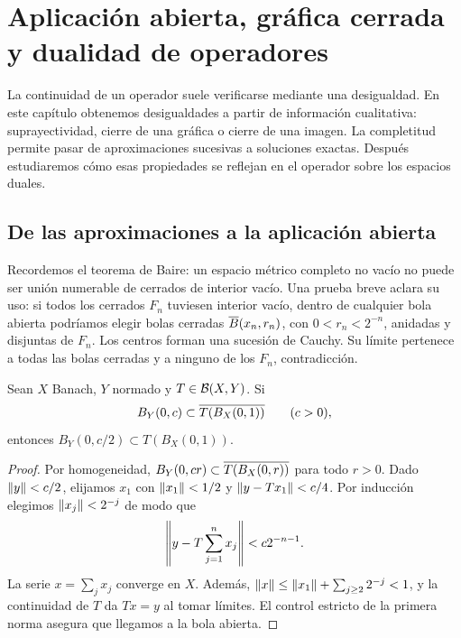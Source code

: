\chapter{Aplicación abierta, gráfica cerrada y dualidad de operadores}\label{cap:v3-04}
La continuidad de un operador suele verificarse mediante una desigualdad. En este capítulo obtenemos desigualdades a partir de información cualitativa: suprayectividad, cierre de una gráfica o cierre de una imagen. La completitud permite pasar de aproximaciones sucesivas a soluciones exactas. Después estudiaremos cómo esas propiedades se reflejan en el operador sobre los espacios duales.

\section{De las aproximaciones a la aplicación abierta}\label{lec:v3-03}
Recordemos el teorema de Baire: un espacio métrico completo no vacío no puede ser unión numerable de cerrados de interior vacío. Una prueba breve aclara su uso: si todos los cerrados $F_n$ tuviesen interior vacío, dentro de cualquier bola abierta podríamos elegir bolas cerradas $\overline{B}(x_n,r_n)$, con $0<r_n<2^{-n}$, anidadas y disjuntas de $F_n$. Los centros forman una sucesión de Cauchy. Su límite pertenece a todas las bolas cerradas y a ninguno de los $F_n$, contradicción.

\begin{lema}\label{v3:levantamiento}
Sean $X$ Banach, $Y$ normado y $T\in\mathcal B(X,Y)$. Si
\[B_Y(0,c)\subset\overline{T(B_X(0,1))}\qquad(c>0),\]
entonces $B_Y(0,c/2)\subset T(B_X(0,1))$.
\end{lema}
\begin{proof}
Por homogeneidad, $B_Y(0,cr)\subset\overline{T(B_X(0,r))}$ para todo $r>0$. Dado $\left\lVert y\right\rVert<c/2$, elijamos $x_1$ con $\left\lVert x_1\right\rVert<1/2$ y $\left\lVert y-Tx_1\right\rVert<c/4$. Por inducción elegimos $\left\lVert x_j\right\rVert<2^{-j}$ de modo que
\[\left\lVert y-T\sum_{j=1}^n x_j\right\rVert<c2^{-n-1}.
\]
La serie $x=\sum_jx_j$ converge en $X$. Además,
$\left\lVert x\right\rVert\le\left\lVert x_1\right\rVert+\sum_{j\ge2}2^{-j}<1$, y la continuidad de $T$ da $Tx=y$ al tomar límites. El control estricto de la primera norma asegura que llegamos a la bola abierta.
\end{proof}

